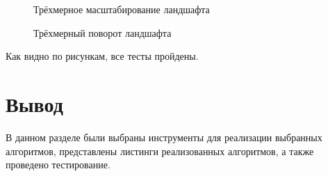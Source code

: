 \begin{figure}
	\caption{Трёхмерное масштабирование ландшафта}
	\label{scale}
\end{figure}

\begin{figure}
	\caption{Трёхмерный поворот ландшафта}
	\label{rotate}
\end{figure}

\newpage
Как видно по рисункам, все тесты пройдены.

\section{Вывод}
В данном разделе были выбраны инструменты для реализации выбранных алгоритмов, представлены листинги реализованных алгоритмов, а также проведено тестирование.